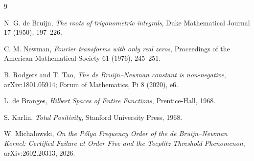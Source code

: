 \documentclass[11pt]{article}
\begin{document}
\begin{thebibliography}{9}

N. G. de Bruijn,
\emph{The roots of trigonometric integrals},
Duke Mathematical Journal 17 (1950), 197--226.

C. M. Newman,
\emph{Fourier transforms with only real zeros},
Proceedings of the American Mathematical Society 61 (1976), 245--251.

B. Rodgers and T. Tao,
\emph{The de Bruijn--Newman constant is non-negative},
arXiv:1801.05914; Forum of Mathematics, Pi 8 (2020), e6.

L. de Branges,
\emph{Hilbert Spaces of Entire Functions},
Prentice-Hall, 1968.

S. Karlin,
\emph{Total Positivity},
Stanford University Press, 1968.

W. Micha\l{}owski,
\emph{On the P\'olya Frequency Order of the de Bruijn--Newman Kernel: Certified Failure at Order Five and the Toeplitz Threshold Phenomenon},
arXiv:2602.20313, 2026.

\end{thebibliography}
\end{document}
